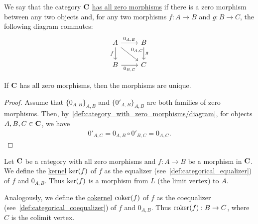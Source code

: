 \begin{definition}\label{def:category_with_zero_morphisms}
  We say that the category $\operatorname{\mathbf{C}}$ \uline{has all zero morphisms} if there is a zero morphism between any two objects and, for any two morphisms \mbox{$f: A \to B$} and \mbox{$g: B \to C$}, the following diagram commutes:
  \begin{equation}\label{def:category_with_zero_morphisms/diagram}
    \begin{tikzcd}[baseline=(current bounding box.center)]
      A \arrow[d, "f"'] \arrow[r, "0_{A,B}"] \arrow[rd, "0_{A,C}"] & B \arrow[d, "g"] \\
      B \arrow[r, "0_{B,C}"']                                      & C
    \end{tikzcd}
  \end{equation}
\end{definition}

\begin{proposition}\label{thm:zero_morphisms_are_unique}
  If $\operatorname{\mathbf{C}}$ has all zero morphisms, then the morphisms are unique.
\end{proposition}
\begin{proof}
  Assume that $\{ 0_{A,B} \}_{A,B}$ and $\{ 0'_{A,B} \}_{A,B}$ are both families of zero morphisms. Then, by~\cref{def:category_with_zero_morphisms/diagram}, for objects $A, B, C \in \operatorname{\mathbf{C}}$, we have
  \begin{align*}
    0'_{A,C} = 0_{A,B} \circ 0'_{B,C} = 0_{A,C}.
  \end{align*}
\end{proof}

\begin{definition}\label{def:categorical_kernel}
  Let $\operatorname{\mathbf{C}}$ be a category with all zero morphisms and $f: A \to B$ be a morphism in $\operatorname{\mathbf{C}}$. We define the \uline{kernel} $\operatorname{ker}(f)$ of $f$ as the equalizer (see~\cref{def:categorical_equalizer}) of $f$ and $0_{A,B}$. Thus $\operatorname{ker}(f)$ is a morphism from $L$ (the limit vertex) to $A$.

  Analogously, we define the \uline{cokernel} $\operatorname{coker}(f)$ of $f$ as the coequalizer (see~\cref{def:categorical_coequalizer}) of $f$ and $0_{A,B}$. Thus $\operatorname{coker}(f): B \to C$, where $C$ is the colimit vertex.
\end{definition}
